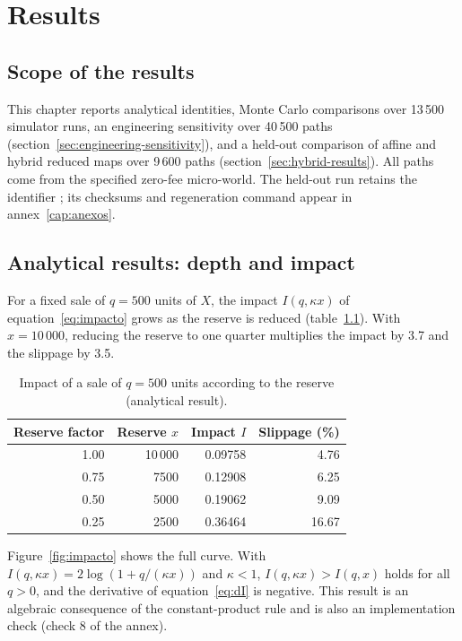 \chapter{Results}
\label{cap:resultados}

\section{Scope of the results}

This chapter reports analytical identities, Monte Carlo comparisons over 13\,500 simulator runs, an engineering sensitivity over 40\,500 paths (section~\ref{sec:engineering-sensitivity}), and a held-out comparison of affine and hybrid reduced maps over 9\,600 paths (section~\ref{sec:hybrid-results}). All paths come from the specified zero-fee micro-world. The held-out run retains the identifier \code{\RunID}; its checksums and regeneration command appear in annex~\ref{cap:anexos}.

\section{Analytical results: depth and impact}
\label{sec:res-analitico}

For a fixed sale of $q=500$ units of $X$, the impact $I(q,\kappa x)$ of equation~\eqref{eq:impacto} grows as the reserve is reduced (table~\ref{tab:impacto}). With $x=10\,000$, reducing the reserve to one quarter multiplies the impact by 3.7 and the slippage by 3.5.

\begin{table}[htbp]
\centering
\caption{Impact of a sale of $q=500$ units according to the reserve (analytical result).}
\label{tab:impacto}
\small
\begin{tabular}{@{}rrrr@{}}
\toprule
Reserve factor & Reserve $x$ & Impact $I$ & Slippage (\%) \\
\midrule
1.00 & 10\,000 & 0.09758 & 4.76 \\
0.75 & 7500 & 0.12908 & 6.25 \\
0.50 & 5000 & 0.19062 & 9.09 \\
0.25 & 2500 & 0.36464 & 16.67 \\
\bottomrule
\end{tabular}
\end{table}

Figure~\ref{fig:impacto} shows the full curve. With $I(q,\kappa x)=2\log(1+q/(\kappa x))$ and $\kappa<1$, $I(q,\kappa x)>I(q,x)$ holds for all $q>0$, and the derivative of equation~\eqref{eq:dI} is negative. This result is an algebraic consequence of the constant-product rule and is also an implementation check (check 8 of the annex).

